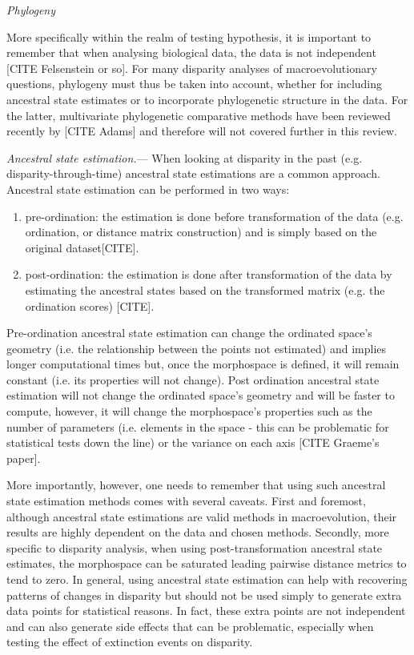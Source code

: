 \documentclass[12pt,letterpaper]{article}
\renewcommand{\subsection}[1]{%
\bigskip
\begin{center}
\begin{large}
\normalfont\itshape #1
\end{large}
\end{center}}
\renewcommand{\subsubsection}[1]{%
\vspace{2ex}
\noindent
\textit{#1.}---}
\begin{document}
\subsection{Phylogeny}
More specifically within the realm of testing hypothesis, it is important to remember that when analysing biological data, the data is not independent [CITE Felsenstein or so].
For many disparity analyses of macroevolutionary questions, phylogeny must thus be taken into account, whether for including ancestral state estimates or to incorporate phylogenetic structure in the data.
For the latter, multivariate phylogenetic comparative methods have been reviewed recently by [CITE Adams] %
and therefore will not covered further in this review.

\subsubsection{Ancestral state estimation}
When looking at disparity in the past (e.g. disparity-through-time) ancestral state estimations are a common approach.
Ancestral state estimation can be performed in two ways:
\begin{enumerate}
\item pre-ordination: the estimation is done before transformation of the data (e.g. ordination, or distance matrix construction) and is simply based on the original dataset[CITE].
\item post-ordination: the estimation is done after transformation of the data by estimating the ancestral states based on the transformed matrix (e.g. the ordination scores) [CITE].
\end{enumerate}
Pre-ordination ancestral state estimation can change the ordinated space's geometry (i.e. the relationship between the points not estimated) and implies longer computational times but, once the morphospace is defined, it will remain constant (i.e. its properties will not change).
Post ordination ancestral state estimation will not change the ordinated space's geometry and will be faster to compute, however, it will change the morphospace's properties such as the number of parameters (i.e. elements in the space - this can be problematic for statistical tests down the line) or the variance on each axis [CITE Graeme's paper].

More importantly, however, one needs to remember that using such ancestral state estimation methods comes with several caveats.
First and foremost, although ancestral state estimations are valid methods in macroevolution, their results are highly dependent on the data and chosen methods.
Secondly, more specific to disparity analysis, when using post-transformation ancestral state estimates, the morphospace can be saturated leading pairwise distance metrics to tend to zero.
In general, using ancestral state estimation can help with recovering patterns of changes in disparity but should not be used simply to generate extra data points for statistical reasons.
In fact, these extra points are not independent and can also generate side effects that can be problematic, especially when testing the effect of extinction events on disparity.
\end{document}
